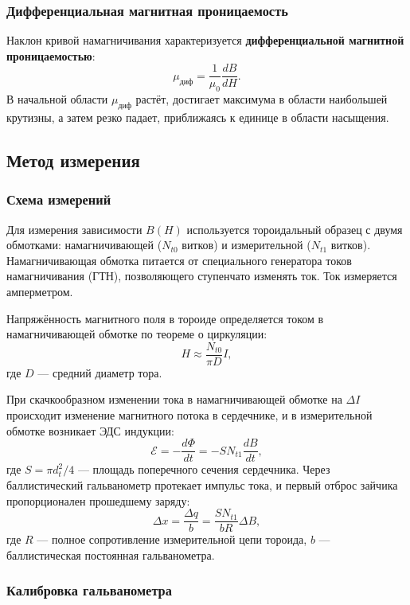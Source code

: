 \documentclass[a4paper]{article}
\begin{document}
\subsubsection{Дифференциальная магнитная проницаемость}

Наклон кривой намагничивания характеризуется \textbf{дифференциальной магнитной проницаемостью}:
\begin{equation}
\mu_{\text{диф}} = \frac{1}{\mu_0} \frac{dB}{dH}.
\label{eq:mu_diff}
\end{equation}
В начальной области $\mu_{\text{диф}}$ растёт, достигает максимума в области наибольшей крутизны, а затем резко падает, приближаясь к единице в области насыщения.

\subsection{Метод измерения}

\subsubsection{Схема измерений}

Для измерения зависимости $B(H)$ используется тороидальный образец с двумя обмотками: намагничивающей ($N_{t0}$ витков) и измерительной ($N_{t1}$ витков). Намагничивающая обмотка питается от специального генератора токов намагничивания (ГТН), позволяющего ступенчато изменять ток. Ток измеряется амперметром.

Напряжённость магнитного поля в тороиде определяется током в намагничивающей обмотке по теореме о циркуляции:
\begin{equation}
H \approx \frac{N_{t0}}{\pi D} I,
\label{eq:H}
\end{equation}
где $D$ — средний диаметр тора.

При скачкообразном изменении тока в намагничивающей обмотке на $\Delta I$ происходит изменение магнитного потока в сердечнике, и в измерительной обмотке возникает ЭДС индукции:
\[
\mathcal{E} = -\frac{d\Phi}{dt} = -S N_{t1} \frac{dB}{dt},
\]
где $S = \pi d_t^2/4$ — площадь поперечного сечения сердечника. Через баллистический гальванометр протекает импульс тока, и первый отброс зайчика пропорционален прошедшему заряду:
\[
\Delta x = \frac{\Delta q}{b} = \frac{S N_{t1}}{b R} \Delta B,
\]
где $R$ — полное сопротивление измерительной цепи тороида, $b$ — баллистическая постоянная гальванометра.

\subsubsection{Калибровка гальванометра}
\end{document}
